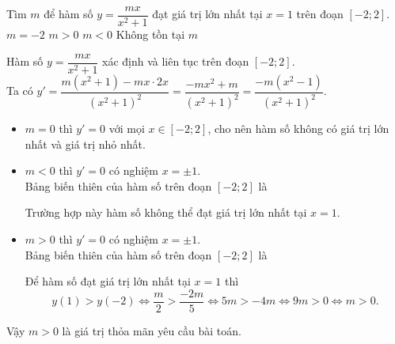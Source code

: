 \begin{ex}%
 Tìm $m$ để hàm số $y=\dfrac{mx}{x^2+1}$ đạt giá trị lớn nhất tại $x=1$ trên đoạn $[-2;2]$.
 \choice
  {$m=-2$}
  {\True $m>0$}
  {$m<0$}
  {Không tồn tại $m$}
 \loigiai
  {
  Hàm số $y=\dfrac{mx}{x^2+1}$ xác định và liên tục trên đoạn $[-2;2]$.\\
  Ta có $y'=\dfrac{m\left(x^2+1\right)-mx\cdot 2x}{\left(x^2+1\right)^2} = \dfrac{-mx^2+m}{\left(x^2+1\right)^2} = \dfrac{-m\left(x^2-1\right)}{\left(x^2+1\right)^2}$.
  \begin{itemize}
   \item $m=0$ thì $y'=0$ với mọi $x\in[-2;2]$, cho nên hàm số không có giá trị lớn nhất và giá trị nhỏ nhất.
   \item $m<0$ thì $y'=0$ có nghiệm $x=\pm 1$.\\
   Bảng biến thiên của hàm số trên đoạn $[-2;2]$ là
   \begin{center}
   \end{center}
   Trường hợp này hàm số không thể đạt giá trị lớn nhất tại $x=1$.
   \item $m>0$ thì $y'=0$ có nghiệm $x=\pm 1$.\\
   Bảng biến thiên của hàm số trên đoạn $[-2;2]$ là
   \begin{center}
   \end{center}
   Để hàm số đạt giá trị lớn nhất tại $x=1$ thì
   \[y(1)>y(-2) \Leftrightarrow \dfrac{m}{2}>\dfrac{-2m}{5} \Leftrightarrow 5m>-4m \Leftrightarrow 9m>0 \Leftrightarrow m>0.\]
  \end{itemize}
  Vậy $m>0$ là giá trị thỏa mãn yêu cầu bài toán.
  }
\end{ex}

